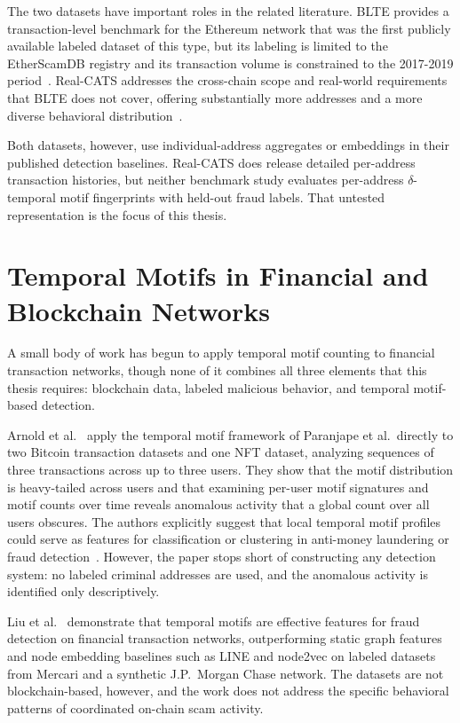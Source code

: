 \documentclass{thesisclass}
\begin{document}
The two datasets have important roles in the related literature.
BLTE provides a transaction-level benchmark for the Ethereum network that was
the first publicly available labeled dataset of this type, but its labeling is
limited to the EtherScamDB registry and its transaction volume is constrained
to the 2017-2019 period~\cite{alemari2021labeled}.
Real-CATS addresses the cross-chain scope and real-world requirements that
BLTE does not cover, offering substantially more addresses and a more diverse
behavioral distribution~\cite{shi2025realcats}.

Both datasets, however, use individual-address aggregates or embeddings in
their published detection baselines. Real-CATS does release detailed
per-address transaction histories, but neither benchmark study evaluates
per-address $\delta$-temporal motif fingerprints with held-out fraud labels.
That untested representation is the focus of this thesis.

\section*{Temporal Motifs in Financial and Blockchain Networks}

A small body of work has begun to apply temporal motif counting to
financial transaction networks, though none of it combines all three
elements that this thesis requires: blockchain data, labeled malicious
behavior, and temporal motif-based detection.

Arnold et al.~\cite{arnold2024motifs} apply the temporal motif framework
of Paranjape et al.\ directly to two Bitcoin transaction datasets and one
NFT dataset, analyzing sequences of three transactions across up to three
users. They show that the motif distribution is heavy-tailed across users
and that examining per-user motif signatures and motif counts over time
reveals anomalous activity that a global count over all users obscures.
The authors explicitly suggest that local temporal motif profiles could
serve as features for classification or clustering in anti-money
laundering or fraud detection~\cite{arnold2024motifs}. However, the
paper stops short of constructing any detection system: no labeled
criminal addresses are used, and the anomalous activity is identified
only descriptively.

Liu et al.~\cite{liu2023temporal} demonstrate that temporal motifs are
effective features for fraud detection on financial transaction networks,
outperforming static graph features and node embedding baselines such as
LINE and node2vec on labeled datasets from Mercari and a synthetic
J.P.\ Morgan Chase network. The datasets are not blockchain-based,
however, and the work does not address the specific behavioral patterns
of coordinated on-chain scam activity.
\end{document}
